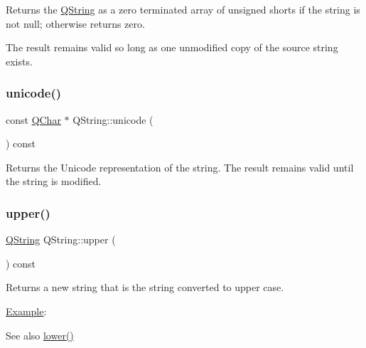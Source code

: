 Returns the \mbox{\hyperlink{class_q_string}{Q\+String}} as a zero terminated array of unsigned shorts if the string is not null; otherwise returns zero.

The result remains valid so long as one unmodified copy of the source string exists. \mbox{\label{class_q_string_af653a95345ba3cd5bade2a1e07f2bb58}} 
\subsubsection{\texorpdfstring{unicode()}{unicode()}}
{\footnotesize\ttfamily const \mbox{\hyperlink{class_q_char}{Q\+Char}} $\ast$ Q\+String\+::unicode (\begin{DoxyParamCaption}{ }\end{DoxyParamCaption}) const\hspace{0.3cm}{\ttfamily [inline]}}

Returns the Unicode representation of the string. The result remains valid until the string is modified. \mbox{\label{class_q_string_a4830365186780874b6e160213a422af8}} 
\subsubsection{\texorpdfstring{upper()}{upper()}}
{\footnotesize\ttfamily \mbox{\hyperlink{class_q_string}{Q\+String}} Q\+String\+::upper (\begin{DoxyParamCaption}{ }\end{DoxyParamCaption}) const}

Returns a new string that is the string converted to upper case.

\mbox{\hyperlink{struct_example}{Example}}\+: 
\begin{DoxyCode}{0}
\end{DoxyCode}


\begin{DoxySeeAlso}{See also}
\mbox{\hyperlink{class_q_string_a77d8e8901007cdda3a71b40d42dbc32c}{lower()}} 
\end{DoxySeeAlso}
\mbox{\label{class_q_string_a6da42912db630af419d216aa0d321ebd}} 
